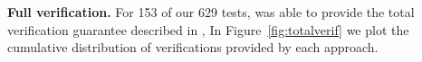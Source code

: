 %

{\bf Full verification.}
For 153 of our 629 tests,  was able to provide the total verification guarantee described in \sect{\ref{sec:totalverif}},
In Figure~\ref{fig:totalverif} we plot the cumulative distribution of
verifications provided by each approach.



